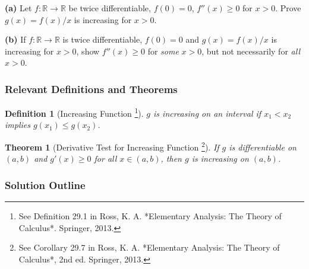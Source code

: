 \documentclass{article}
\newtheorem*{definition}{Definition}
\newtheorem*{theorem}{Theorem}
\newcommand{\R}{\mathbb{R}}
\begin{document}
\textbf{(a)} Let \(f: \R \to \R\) be twice differentiable, \(f(0)=0\), \(f''(x)\ge 0\) for \(x>0\). Prove \(g(x)=f(x)/x\) is increasing for \(x>0\).

\textbf{(b)} If \(f: \R \to \R\) is twice differentiable, \(f(0)=0\) and \(g(x)=f(x)/x\) is increasing for \(x>0\), show \(f''(x)\ge 0\) for \textit{some} \(x>0\), but not necessarily for \textit{all} \(x>0\).

\subsubsection*{Relevant Definitions and Theorems}

\begin{definition}[Increasing Function \footnote{See Definition 29.1 in Ross, K. A. *Elementary Analysis: The Theory of Calculus*. Springer, 2013.}]
\(g\) is increasing on an interval if \(x_1 < x_2\) implies \(g(x_1) \le g(x_2)\).
\end{definition}

\begin{theorem}[Derivative Test for Increasing Function \footnote{See Corollary 29.7 in Ross, K. A. *Elementary Analysis: The Theory of Calculus*, 2nd ed. Springer, 2013.}]
If \(g\) is differentiable on \((a, b)\) and \(g'(x) \ge 0\) for all \(x \in (a, b)\), then \(g\) is increasing on \((a, b)\).
\end{theorem}

\subsubsection*{Solution Outline}
\end{document}
